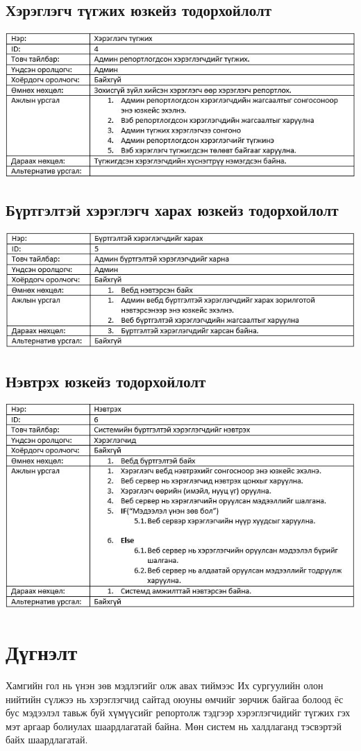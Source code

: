 \documentclass[
oneside, %
english, %
onehalfspacing, %
nolistspacing, %
headsepline, %
]{article} %
\begin{document}
     \subsection{Хэрэглэгч түгжих юзкейз тодорхойлолт}
     \includegraphics[width=\textwidth]{usecaseT4}
     \subsection{Бүртгэлтэй хэрэглэгч харах юзкейз тодорхойлолт }
     \includegraphics[width=\textwidth]{usecaseT5}
     \subsection{Нэвтрэх юзкейз тодорхойлолт}
     \includegraphics[width=\textwidth]{usecaseT6}
     
     \section{Дүгнэлт}
     Хамгийн гол нь үнэн зөв мэдлэгийг олж авах тиймээс Их сургуулийн олон нийтийн сүлжээ нь хэрэглэгчид сайтад оюуны өмчийг зөрчиж байгаа болоод ёс бус мэдээлэл тавьж буй хүмүүсийг репортолж тэдгээр хэрэглэгчидийг түгжих гэх мэт аргаар болиулах шаардлагатай байна. Мөн систем нь халдлаганд тэсвэртэй байх шаардлагатай.
    
\end{document}

